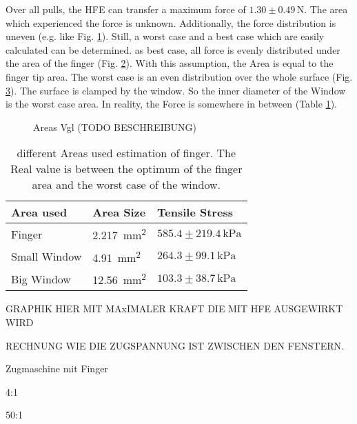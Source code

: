 Over all pulls, the HFE can transfer a maximum force of $1.30\pm0.49\,\si{\newton}$. The area which experienced the force is unknown. Additionally, the force distribution is uneven (e.g. like Fig. \ref{fig:ZeichnungBerechnungStress_a}). Still, a worst case and a best case which are easily calculated can be determined. as best case, all force is evenly distributed under the area of the finger (Fig. \ref{fig:ZeichnungBerechnungStress_b}). With this assumption, the Area is equal to the finger tip area. The worst case is an even distribution over the whole surface (Fig. \ref{fig:ZeichnungBerechnungStress_c}). The surface is clamped by the window. So the inner diameter of the Window is the worst case area. In reality, the Force is somewhere in between (Table \ref{table:VerschAbschätzungenStressFinger}).

\begin{figure}[hbt!]
	\centering
	\begin{subfigure}[]{0.3\textwidth}
		\centering
		
		\caption{}
		\label{fig:ZeichnungBerechnungStress_a}
	\end{subfigure}
	\begin{subfigure}[]{0.3\textwidth}
		\centering
		
		\caption{}
		\label{fig:ZeichnungBerechnungStress_b}
	\end{subfigure}
	\begin{subfigure}[]{0.3\textwidth}
		\centering
		
		\caption{}
		\label{fig:ZeichnungBerechnungStress_c}
	\end{subfigure}
	\caption{Areas Vgl (TODO BESCHREIBUNG)}
	\label{fig:ZeichnungBerechnungStress}
\end{figure}


\begin{table}[hbt!]
	\centering
	\begin{tabular}{|l|l|l|}
		\hline
		Area used & Area Size & Tensile Stress\\
		\hline
		\hline
		Finger & \SI{2.217}{\milli\meter\squared} & $585.4\pm219.4\,\si{\kilo\pascal}$ \\ 
		\hline
		Small Window & \SI{4.91}{\milli\meter\squared} & $264.3\pm99.1\,\si{\kilo\pascal}$ \\ 
		\hline
		Big Window & \SI{12.56}{\milli\meter\squared} & $103.3\pm38.7\,\si{\kilo\pascal}$ \\ 
		\hline
	\end{tabular}
	\caption{different Areas used estimation of finger. The Real value is between the optimum of the finger area and the worst case of the window.}
	\label{table:VerschAbschätzungenStressFinger}
\end{table}



GRAPHIK HIER MIT MAxIMALER KRAFT DIE MIT HFE AUSGEWIRKT WIRD

RECHNUNG WIE DIE ZUGSPANNUNG IST ZWISCHEN DEN FENSTERN.

	Zugmaschine mit Finger

4:1

50:1 


